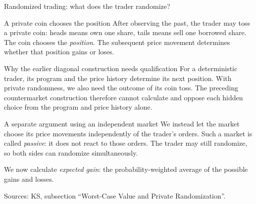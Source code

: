 \documentclass{beamer}
\newcommand{\sourcefoot}[1]{%
  \par\vfill{\fontsize{6.3}{7.5}\selectfont\color{black!65}Sources: #1\par}}
\begin{document}
\begin{frame}[shrink=8]{Randomized trading: what does the trader randomize?}
\small
\begin{block}{A private coin chooses the position}
After observing the past, the trader may toss a private coin:
heads means own one share, tails means sell one borrowed share.
The coin chooses the \emph{position}.
The subsequent price movement determines whether that position gains or loses.
\end{block}

\begin{alertblock}{Why the earlier diagonal construction needs qualification}
For a deterministic trader, its program and the price history determine
its next position.
With private randomness, we also need the outcome of its coin toss.
The preceding countermarket construction therefore cannot calculate and
oppose each hidden choice from the program and price history alone.
\end{alertblock}

\begin{exampleblock}{A separate argument using an independent market}
We instead let the market choose its price movements independently of
the trader's orders. Such a market is called \emph{passive}: it does not
react to those orders.
The trader may still randomize, so both sides can randomize simultaneously.
\par\smallskip
We now calculate \emph{expected gain}: the probability-weighted average
of the possible gains and losses.
\end{exampleblock}
\sourcefoot{KS, subsection \enquote{Worst-Case Value and Private Randomization}.}
\end{frame}
\end{document}
